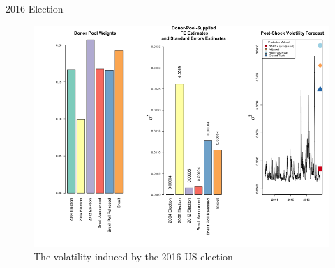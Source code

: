 \documentclass[9pt]{beamer}
\theoremstyle{definition}
\begin{document}
    \begin{frame}{2016 Election}
        \begin{figure}[H]
            \begin{center}
              \includegraphics[scale=.34]{real_data_output_plots/TueSep241059512024_IYG_None_None.png}
              \caption{The volatility induced by the 2016 US election}
              \label{fig:SVF_2016}
              \end{center}
            \end{figure}
    \end{frame}

    




\end{document}
